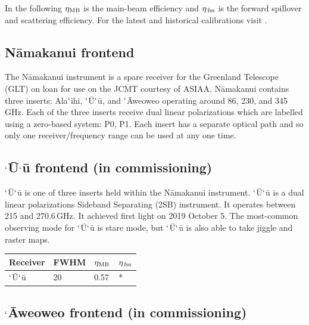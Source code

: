 \documentclass[11pt,oneside,chapters]{starlink}
\newcommand{\uarcs}{\hspace{-0.27em}\arcsec\hspace{-0.07em}}
\newcommand{\uarcs}{$''$}
\begin{document}
In the following $\eta_{\textnormal{MB}}$ is the main-beam efficiency and
$\eta_{\textnormal{\,fss}}$ is the forward spillover and scattering efficiency.
For the latest and historical calibrations visit
.



\subsection{N\=amakanui frontend}

The N\=amakanui instrument is a spare receiver for the Greenland
Telescope (GLT) on loan for use on the JCMT courtesy of ASIAA.
N\=amakanui contains three inserts: Ala$`$ihi, $`$\=U$`$\=u, and
$`$\=Aweoweo operating around 86, 230, and 345\,GHz. Each of the three
inserts receive dual linear polarizations which are labelled using a
zero-based system: P0, P1. Each insert has a separate optical path and
so only one receiver/frequency range can be used at any one time.

\subsection{$`$\=U$`$\=u frontend (in commissioning)}

$`$\=U$`$\=u is one of three inserts held within the N\=amakanui
instrument. $`$\=U$`$\=u is a dual linear polarizations Sideband
Separating (2SB) instrument. It operates between 215 and 270.6\,GHz.
It achieved first light on 2019 October 5.  The most-common observing
mode for $`$\=U$`$\=u is stare mode, but $`$\=U$`$\=u is also able to
take jiggle and raster maps.

\begin{table}[h!]
\begin{center}
\begin{tabular}{|p{1.5cm}|p{1.2cm}|p{0.8cm}|p{0.8cm}|}
\hline
Receiver &FWHM & $\eta_{\textnormal{MB}}$ & $\eta_{\textnormal{\,fss}}$\\
\hline
$`$\=U$`$\=u&20\uarcs&0.57 & *\\
\hline
\end{tabular}
\end{center}
\end{table}


\subsection{$`$\=Aweoweo frontend (in commissioning)}
\end{document}
